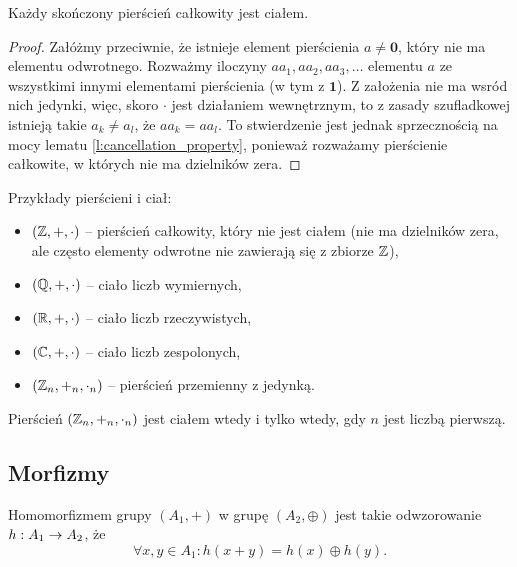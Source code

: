 \documentclass[11pt]{scrartcl}
\begin{document}
    \begin{theorem}
        Każdy skończony pierścień całkowity jest ciałem.
    \end{theorem}
    \begin{proof}
        Załóżmy przeciwnie, że istnieje element pierścienia $a \neq \mathbf{0}$, który nie ma elementu odwrotnego. Rozważmy iloczyny $aa_1, aa_2, aa_3, \ldots$ elementu $a$ ze wszystkimi innymi elementami pierścienia (w tym z $\mathbf{1}$). Z założenia nie ma wsród nich jedynki, więc, skoro $\cdot$ jest działaniem wewnętrznym, to z zasady szufladkowej istnieją takie $a_k \neq a_l$, że $aa_k = aa_l$. To stwierdzenie jest jednak sprzecznością na mocy lematu \ref{l:cancellation_property}, ponieważ rozważamy pierścienie całkowite, w których nie ma dzielników zera.
    \end{proof}

    \begin{example}
        Przykłady pierścieni i ciał:
        \begin{itemize}
            \item $(\mathbb Z, +, \cdot)$ -- pierścień całkowity, który nie jest ciałem (nie ma dzielników zera, ale często elementy odwrotne nie zawierają się z zbiorze $\mathbb Z$),
            \item $(\mathbb Q, +, \cdot)$ -- ciało liczb wymiernych,
            \item $(\mathbb R, +, \cdot)$ -- ciało liczb rzeczywistych,
            \item $(\mathbb C, +, \cdot)$ -- ciało liczb zespolonych,
            \item $(\mathbb Z_n, +_n, \cdot_n)$ -- pierścień przemienny z jedynką.
        \end{itemize}
    \end{example}

    \begin{corollary}
        Pierścień $(\mathbb Z_n, +_n, \cdot_n)$ jest ciałem wtedy i tylko wtedy, gdy $n$ jest liczbą pierwszą.
    \end{corollary}

    \subsection{Morfizmy}
    \begin{definition}
        \label{d:homomorphism}
        Homomorfizmem grupy $(A_1, +)$ w grupę $(A_2, \oplus)$ jest takie odwzorowanie $h : A_1 \rightarrow A_2$, że
        $$ \forall x, y \in A_1 : h(x + y) = h(x) \oplus h(y). $$
    \end{definition}
\end{document}
